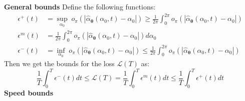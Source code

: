 \documentclass{article} %
\newcounter{ct}
\theoremstyle{definition}
\theoremstyle{remark}
\begin{document}
%

\textbf{General bounds}
Define the following functions:
\begin{equation}
\begin{split}
    \epsilon^+(t) &= \sup_{\alpha_{0}} \; o_{\pi} \left( \left| \hat{\alpha}_{\boldsymbol{\theta}}(\alpha_{0}, t) - \alpha_{0}  \right| \right) \geq \frac{1}{2 \pi} \int_{0}^{2 \pi}  o_{\pi} \left( \left| \hat{\alpha}_{\boldsymbol{\theta}}(\alpha_{0}, t) - \alpha_{0}  \right| \right)  \\
     \epsilon^{m}(t) &= \frac{1}{2 \pi} \int_{0}^{2 \pi}  o_{\pi} \left( \left| \hat{\alpha}_{\boldsymbol{\theta}}(\alpha_{0}, t) - \alpha_{0}  \right| \right) d\alpha_{0} \\
    \epsilon^-(t) &= \inf_{\alpha_{0}} \; o_{\pi} \left( \left| \hat{\alpha}_{\boldsymbol{\theta}}(\alpha_{0}, t) - \alpha_{0}  \right| \right) \leq \frac{1}{2 \pi} \int_{0}^{2 \pi}  o_{\pi} \left( \left| \hat{\alpha}_{\boldsymbol{\theta}}(\alpha_{0}, t) - \alpha_{0}  \right| \right)
\end{split}
\end{equation}
Then we get the bounds for the loss \(\mathcal{L}(T)\) as:
\begin{equation}
    \frac{1}{T} \int_{0}^{T} \epsilon^-(t)dt \leq \mathcal{L}(T) = \frac{1}{T} \int_{0}^{T} \epsilon^{m}(t) dt \leq  \frac{1}{T} \int_{0}^{T} \epsilon^+(t) dt
\end{equation}
\textbf{Speed bounds}
\end{document}
